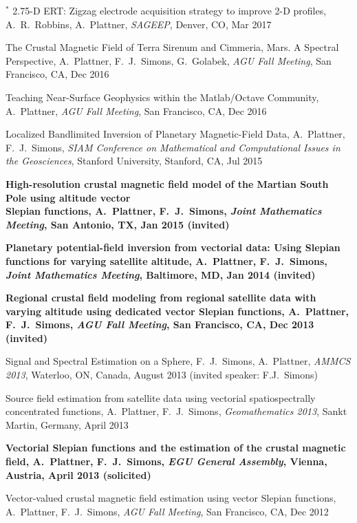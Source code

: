 \documentclass[10pt]{article}
\begin{document}
\spcp 
\hspace{-0.4cm} $^*$ 2.75-D ERT: Zigzag electrode acquisition strategy
to improve 2-D profiles,
A.~R.~Robbins, A.~Plattner,
\emph{SAGEEP}, Denver, CO, Mar 2017

\spcp
The Crustal Magnetic Field of Terra Sirenum and Cimmeria, Mars. A Spectral Perspective,
A.~Plattner, F.~J.~Simons, G.~Golabek, 
\emph{AGU Fall Meeting}, San Francisco, CA, Dec 2016

\spcp
Teaching Near-Surface Geophysics within the Matlab/Octave Community,
A.~Plattner, 
\emph{AGU Fall Meeting}, San Francisco, CA, Dec 2016

\spcp
Localized Bandlimited Inversion of Planetary Magnetic-Field Data,
A.~Plattner, F.~J.~Simons,
\emph{SIAM Conference on Mathematical and Computational Issues in the Geosciences},
Stanford University, Stanford, CA, Jul 2015


\spcp
\textbf{High-resolution crustal magnetic field model of the Martian South Pole using altitude vector\\ Slepian functions,
A.~Plattner, F.~J.~Simons,
\emph{Joint Mathematics Meeting}, San Antonio, TX, Jan 2015 (invited)}

\spcp
\textbf{Planetary potential-field inversion from vectorial data: Using Slepian functions for varying satellite altitude,
A.~Plattner, F.~J.~Simons,
\emph{Joint Mathematics Meeting}, Baltimore, MD, Jan 2014 (invited)}

\spcp
\textbf{Regional crustal field modeling from regional satellite data with varying altitude using dedicated vector Slepian functions,
A.~Plattner, F.~J.~Simons,
\emph{AGU Fall Meeting}, San Francisco, CA, Dec 2013 (invited)}

\spcp
Signal and Spectral Estimation on a Sphere,
F.~J.~Simons, A.~Plattner,
\emph{AMMCS 2013}, Waterloo, ON, Canada, August 2013 (invited speaker: F.J.~Simons)

\spcp
Source field estimation from satellite data using vectorial spatiospectrally 
concentrated functions,
A.~Plattner, F.~J.~Simons,
\emph{Geomathematics 2013}, Sankt Martin, Germany, April 2013

\spcp
\textbf{Vectorial Slepian functions and the estimation of the crustal magnetic field,
A.~Plattner, F.~J.~Simons,
\emph{EGU General Assembly}, Vienna, Austria, April 2013 (solicited)}

\spcp
Vector-valued crustal magnetic field estimation using vector Slepian functions,
A.~Plattner, F.~J.~Simons,
\emph{AGU Fall Meeting}, San Francisco, CA, Dec 2012
\end{document}
